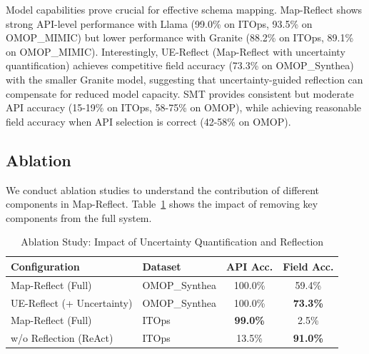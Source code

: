 \documentclass[sigconf, nonacm]{acmart}
\newcommand{\deleted}[1]{\textcolor{red}{#1}}
\begin{document}
Model capabilities prove crucial for effective schema mapping. Map-Reflect shows strong API-level performance with Llama (99.0\% on ITOps, 93.5\% on OMOP\_MIMIC) but lower performance with Granite (88.2\% on ITOps, 89.1\% on OMOP\_MIMIC). Interestingly, UE-Reflect (Map-Reflect with uncertainty quantification) achieves competitive field accuracy (73.3\% on OMOP\_Synthea) with the smaller Granite model, suggesting that uncertainty-guided reflection can compensate for reduced model capacity. SMT provides consistent but moderate API accuracy (15-19\% on ITOps, 58-75\% on OMOP), while achieving reasonable field accuracy when API selection is correct (42-58\% on OMOP).

\subsection{Ablation}

We conduct ablation studies to understand the contribution of different components in Map-Reflect. Table~\ref{tab:ablation_study} shows the impact of removing key components from the full system.

\begin{table}[htbp]
\centering
\begin{tabular}{ll|cc}
\toprule
\textbf{Configuration} & \textbf{Dataset} & \textbf{API Acc.} & \textbf{Field Acc.} \\
\midrule
Map-Reflect (Full) & OMOP\_Synthea & 100.0\% & 59.4\% \\
UE-Reflect (+ Uncertainty) & OMOP\_Synthea & 100.0\% & \textbf{73.3\%} \\
\midrule
Map-Reflect (Full) & ITOps & \textbf{99.0\%} & 2.5\% \\
w/o Reflection (ReAct) & ITOps & 13.5\% & \textbf{91.0\%} \\
\bottomrule
\end{tabular}
\caption{Ablation Study: Impact of Uncertainty Quantification and Reflection}
\label{tab:ablation_study}
\end{table}

\end{document}
